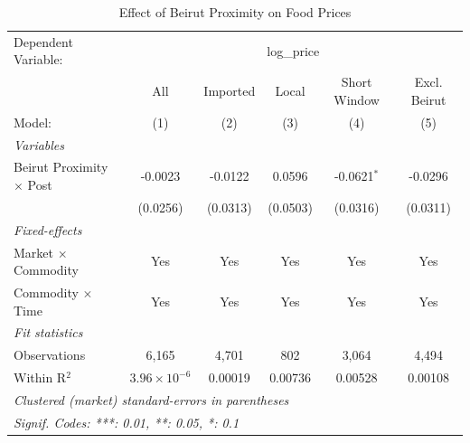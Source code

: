 
\begin{table}[htbp]
   \caption{\label{tab:main} Effect of Beirut Proximity on Food Prices}
   \centering
   \footnotesize
   \begin{tabular}{lccccc}
      \tabularnewline \midrule \midrule
      Dependent Variable: & \multicolumn{5}{c}{log\_price}\\
                                      & All                   & Imported & Local    & Short Window  & Excl. Beirut \\   
      Model:                          & (1)                   & (2)      & (3)      & (4)           & (5)\\  
      \midrule
      \emph{Variables}\\
      Beirut Proximity $\times$ Post  & -0.0023               & -0.0122  & 0.0596   & -0.0621$^{*}$ & -0.0296\\   
                                      & (0.0256)              & (0.0313) & (0.0503) & (0.0316)      & (0.0311)\\   
      \midrule
      \emph{Fixed-effects}\\
      Market $\times$ Commodity       & Yes                   & Yes      & Yes      & Yes           & Yes\\  
      Commodity $\times$ Time         & Yes                   & Yes      & Yes      & Yes           & Yes\\  
      \midrule
      \emph{Fit statistics}\\
      Observations                    & 6,165                 & 4,701    & 802      & 3,064         & 4,494\\  
      Within R$^2$                    & $3.96\times 10^{-6}$  & 0.00019  & 0.00736  & 0.00528       & 0.00108\\  
      \midrule \midrule
      \multicolumn{6}{l}{\emph{Clustered (market) standard-errors in parentheses}}\\
      \multicolumn{6}{l}{\emph{Signif. Codes: ***: 0.01, **: 0.05, *: 0.1}}\\
   \end{tabular}
\end{table}


